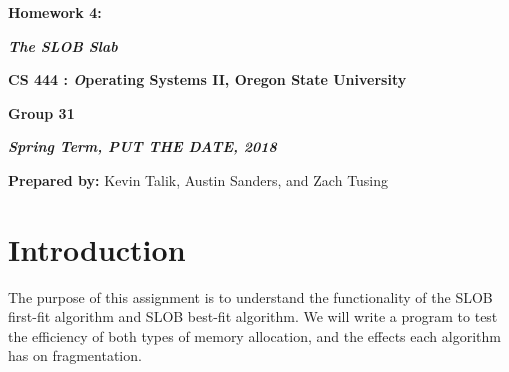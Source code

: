 \documentclass[onecolumn, draftclsnofoot,10pt, compsoc]{IEEEtran}
\def \GroupMemberOne{			Kevin Talik}
\def \GroupMemberTwo{			Austin Sanders}
\def \GroupMemberThree{			Zach Tusing}
\begin{document}
 	\begin{center}
	\huge\bf{ Homework 4:} 
   
    \large\textbf{\textit{ The SLOB Slab }}\par
     
    
    
	\small{\bf CS 444 : \textit Operating Systems II, Oregon State University}\par
    \small{\bf{Group 31}}
    
    
    {\bf\textit{ Spring Term, PUT THE DATE, 2018} }
    
    
    {\small {\bf Prepared by:} \GroupMemberOne, \GroupMemberTwo, and \GroupMemberThree }
        \end{center}
 		\vfill

       \pagebreak
       \section{Introduction}
        The purpose of this assignment is to understand the functionality of the SLOB first-fit algorithm and SLOB best-fit algorithm. We will write a program to test the efficiency of both types of memory allocation, and the effects each algorithm has on fragmentation.


        
\end{document}
